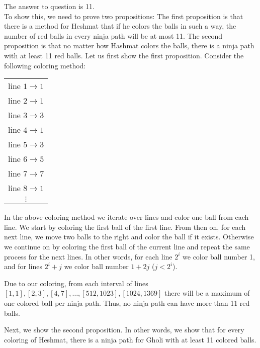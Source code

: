 \begin{solution}
The answer to question is 11.\\[0.2cm]

To show this, we need to prove two propositions:
The first proposition  is that there is a method for Heshmat that if he colors the balls in such a way, the number of red balls in every ninja path will be at most 11.
The second proposition is that no matter how Hashmat colors the balls, there is a ninja path with at least 11 red balls.
Let us first show the first proposition. Consider the following coloring method:
\begin{center}
\begin{tabular}{c}

line $1 \rightarrow 1$\\

line $2 \rightarrow 1$\\

line $3 \rightarrow 3$\\

line $4 \rightarrow 1$\\

line $5 \rightarrow 3$\\

line $6 \rightarrow 5$\\

line $7 \rightarrow 7$\\

line $8 \rightarrow 1$\\

$\vdots$\\
\end{tabular}
\end{center}
In the above coloring method we iterate over lines and color one ball from each line. We start by coloring the first ball of the first line. From then on, for each next line, we move two balls to the right and color the ball if it exists. Otherwise we continue on by coloring the first ball of the current line and repeat the same process for the next lines. In other words, for each line $2^i$ we color ball number 1, and for lines $2^i +j$ we color ball number $1+2j$ ($j < 2^i$).

Due to our coloring, from each interval of lines
$[1,1], [2,3], [4,7], \ldots, [512,1023], [1024,1369]$
there will be a maximum of one colored ball per ninja path. Thus, no ninja path can have more than 11 red balls.


Next, we show the second proposition. In other words, we show that for every coloring of Heshmat, there is a ninja path for Gholi with at least 11 colored balls.


\end{solution}
